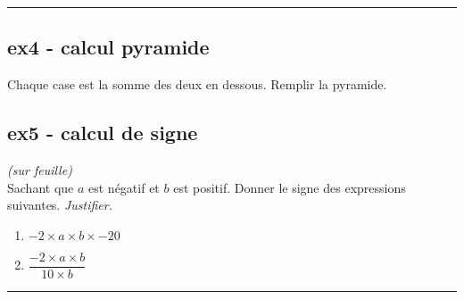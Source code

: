 \documentclass[11pt]{article}
\newcommand{\horrule}[1]{\rule{\linewidth}{#1}} %
\begin{document}
\vspace{-0.4cm}
\horrule{1px}
\vspace{-0.8cm}

\begin{multicols}{2}

  \subsection*{ex4 - calcul pyramide}

  Chaque case est la somme des deux en dessous. Remplir la pyramide.


  \subsection*{ex5 - calcul de signe}
  \textit{(sur feuille)}\\
  Sachant que $a$ est négatif et $b$ est positif. Donner le signe des expressions suivantes. \textit{Justifier.}

  \begin{enumerate}
  \item  $-2 \times a \times b \times -20$
  \item $\dfrac{-2 \times a \times b}{10 \times b}$
  \end{enumerate}

\end{multicols}

\vspace{-0.4cm}
\horrule{1px}
\vspace{-0.8cm}
\end{document}

